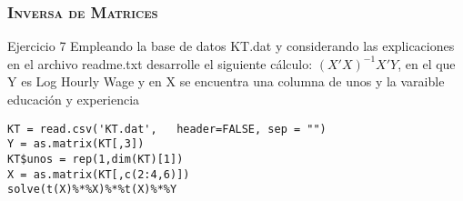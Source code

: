\documentclass[16.5pt]{beamer}
\begin{document}
{
\begin{frame}
\frametitle{\textsc{\textbf{Inversa de Matrices}}}
\hspace*{-5mm}
\vspace*{-5mm} 
\vspace{0.3cm}
\begin{bclogo}{Ejercicio 7}
 {\color{blue} Empleando la base de datos KT.dat y considerando las explicaciones en el archivo readme.txt desarrolle el siguiente cálculo: $(X'X)^{-1}X'Y$, en el que Y es Log Hourly Wage  y en X se encuentra una columna de unos y la varaible educación y experiencia}
\begin{lstlisting}[basicstyle=\small]
KT = read.csv('KT.dat',   header=FALSE, sep = "")
Y = as.matrix(KT[,3])
KT$unos = rep(1,dim(KT)[1])
X = as.matrix(KT[,c(2:4,6)])
solve(t(X)%*%X)%*%t(X)%*%Y


\end{lstlisting}
\end{bclogo}

\end{frame}
}
\end{document}
